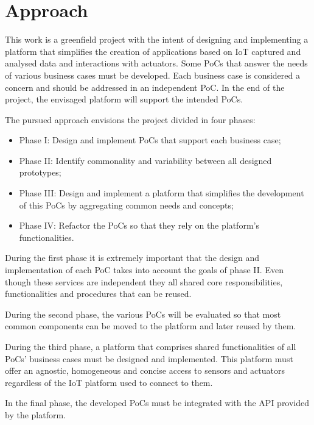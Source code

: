 \section{Approach}
\label{sec:introduction:approach}

This work is a greenfield project with the intent of designing and implementing a platform that simplifies the creation of applications based on \gls{IoT} captured and analysed data and interactions with actuators. Some \gls{PoC}s that answer the needs of various business cases must be developed.
Each business case is considered a concern and should be addressed in an independent \gls{PoC}.
In the end of the project, the envisaged platform will support the intended \gls{PoC}s.

The pursued approach envisions the project divided in four phases:

\begin{itemize}
    \item Phase I: Design and implement \gls{PoC}s that support each business case;
    \item Phase II: Identify commonality and variability between all designed prototypes;
    \item Phase III: Design and implement a platform that simplifies the development of this \gls{PoC}s by aggregating common needs and concepts;
    \item Phase IV: Refactor the \gls{PoC}s so that they rely on the platform's functionalities.
\end{itemize}

During the first phase it is extremely important that the design and implementation of each \gls{PoC} takes into account the goals of phase II. Even though these services are independent they all shared core responsibilities, functionalities and procedures that can be reused.

During the second phase, the various \gls{PoC}s will be evaluated so that most common components can be moved to the platform and later reused by them.

During the third phase, a platform that comprises shared functionalities of all \gls{PoC}s' business cases must be designed and implemented. This platform must offer an agnostic, homogeneous and concise access to sensors and actuators regardless of the \gls{IoT} platform used to connect to them.

In the final phase, the developed \gls{PoC}s must be integrated with the \gls{API} provided by the platform.

